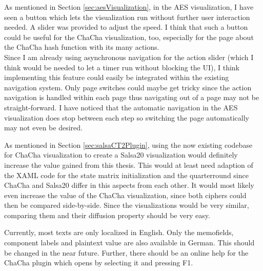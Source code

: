 \begin{description}[style=nextline]
As mentioned in Section \ref{sec:aesVisualization}, in the AES visualization, I have seen a button which lets the visualization run without further user interaction needed. A slider was provided to adjust the speed. I think that such a button could be useful for the ChaCha visualization, too, especially for the page about the ChaCha hash function with its many actions. \\
Since I am already using asynchronous navigation for the action slider (which I think would be needed to let a timer run without blocking the UI), I think implementing this feature could easily be integrated within the existing navigation system. Only page switches could maybe get tricky since the action navigation is handled within each page thus navigating out of a page may not be straight-forward. I have noticed that the automatic navigation in the AES visualization does stop between each step so switching the page automatically may not even be desired.

\item[Salsa20 visualization]

As mentioned in Section \ref{sec:salsaCT2Plugin}, using the now existing codebase for ChaCha visualization to create a Salsa20 visualization would definitely increase the value gained from this thesis. This would at least need adaption of the XAML code for the state matrix initialization and the quarterround since ChaCha and Salsa20 differ in this aspects from each other. It would most likely even increase the value of the ChaCha visualization, since both ciphers could then be compared side-by-side. Since the visualizations would be very similar, comparing them and their diffusion property should be very easy.

\item[Localization and online help]

Currently, most texts are only localized in English. Only the memofields, component labels and plaintext value are also available in German. This should be changed in the near future. Further, there should be an online help for the ChaCha plugin which opens by selecting it and pressing F1.

\end{description}

